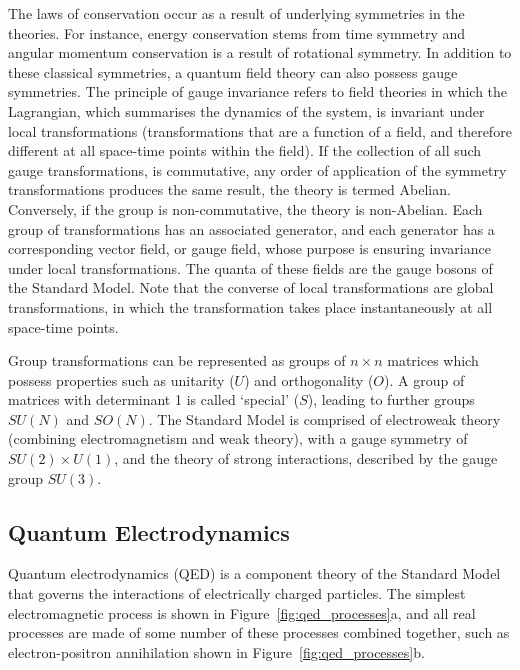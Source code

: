 The laws of conservation occur as a result of underlying symmetries in the theories. For instance, energy
conservation stems from time symmetry and angular momentum conservation is a result of rotational symmetry.
In addition to these classical symmetries, a quantum field theory can also possess gauge symmetries. The
principle of gauge invariance refers to field theories in which the Lagrangian, which summarises the dynamics
of the system, is invariant under local transformations (transformations that are a function of a field, and
therefore different at all space-time points within the field). %
If the collection of all such gauge transformations, is commutative, \ie any order of application of the
symmetry transformations produces the same result, the theory is termed Abelian. Conversely, if the group is
non-commutative, the theory is non-Abelian. Each group of transformations has an associated generator, and
each generator has a corresponding vector field, or gauge field, whose purpose is ensuring invariance under
local transformations. The quanta of these fields are the gauge bosons of the Standard Model. Note that the
converse of local transformations are global transformations, in which the transformation takes place
instantaneously at all space-time points.

Group transformations can be represented as groups of $n \times n$ matrices which possess properties such as
unitarity ($U$) and orthogonality ($O$). A group of matrices with determinant 1 is called `special' ($S$),
leading to further groups $SU(N)$ and $SO(N)$. The Standard Model is comprised of electroweak theory
(combining electromagnetism and weak theory), with a gauge symmetry of $SU(2) \times U(1)$, and the theory of
strong interactions, described by the gauge group $SU(3)$.

\subsection{Quantum Electrodynamics}
\label{ss:quantum_electrodynamics}

Quantum electrodynamics (QED) is a component theory of the Standard Model that governs the interactions of
electrically charged particles. The simplest electromagnetic process is shown in
Figure~\ref{fig:qed_processes}a, and all real processes are made of some number of these processes combined
together, such as electron-positron annihilation shown in Figure~\ref{fig:qed_processes}b.

